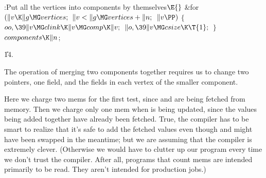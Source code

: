 \Y\B\4:Put all the vertices into components by themselves\X${}\E{}$\6
\&{for} ${}(\|v\K\|g\MG\\{vertices};{}$ ${}\|v<\|g\MG\\{vertices}+\|n;{}$ ${}%
\|v\PP){}$\5
${}\{{}$\1\6
${}\\{oo},\39\|v\MG\\{clink}\K\|v\MG\\{comp}\K\|v;{}$\6
${}\|o,\39\|v\MG\\{csize}\K\T{1};{}$\6
\4${}\}{}$\2\6
${}\\{components}\K\|n{}$;\par
\U14.\fi

The operation of merging two components together requires us to
change two  pointers, one  field, and the 
fields in each vertex of the smaller component.

Here we charge two mems for the first  test, since  and
 are being fetched from memory. Then we charge only one
mem
when  is being updated, since the values being added
together
have already been fetched. True, the compiler has to be smart to
realize that it's safe to add the fetched values 
even though  and  might have been swapped in the meantime;
but we are assuming that the compiler is extremely clever. (Otherwise we
would have to clutter up our program every time we don't trust the compiler.
After all, programs that count mems are intended primarily to be read.
They aren't intended for production jobs.) %

